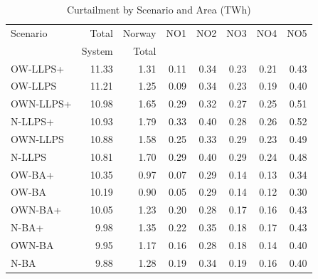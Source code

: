 \begin{table}[htbp]
\centering
\caption{Curtailment by Scenario and Area (TWh)}
\label{tab:curtailment_summary}
\begin{tabular}{lrrrrrrr}
\toprule
Scenario & Total & Norway & NO1 & NO2 & NO3 & NO4 & NO5 \\
         & System & Total &     &     &     &     &     \\
\midrule
OW-LLPS+ & 11.33 & 1.31 & 0.11 & 0.34 & 0.23 & 0.21 & 0.43 \\
OW-LLPS & 11.21 & 1.25 & 0.09 & 0.34 & 0.23 & 0.19 & 0.40 \\
OWN-LLPS+ & 10.98 & 1.65 & 0.29 & 0.32 & 0.27 & 0.25 & 0.51 \\
N-LLPS+ & 10.93 & 1.79 & 0.33 & 0.40 & 0.28 & 0.26 & 0.52 \\
OWN-LLPS & 10.88 & 1.58 & 0.25 & 0.33 & 0.29 & 0.23 & 0.49 \\
N-LLPS & 10.81 & 1.70 & 0.29 & 0.40 & 0.29 & 0.24 & 0.48 \\
OW-BA+ & 10.35 & 0.97 & 0.07 & 0.29 & 0.14 & 0.13 & 0.34 \\
OW-BA & 10.19 & 0.90 & 0.05 & 0.29 & 0.14 & 0.12 & 0.30 \\
OWN-BA+ & 10.05 & 1.23 & 0.20 & 0.28 & 0.17 & 0.16 & 0.43 \\
N-BA+ & 9.98 & 1.35 & 0.22 & 0.35 & 0.18 & 0.17 & 0.43 \\
OWN-BA & 9.95 & 1.17 & 0.16 & 0.28 & 0.18 & 0.14 & 0.40 \\
N-BA & 9.88 & 1.28 & 0.19 & 0.34 & 0.19 & 0.16 & 0.40 \\
\bottomrule
\end{tabular}
\end{table}